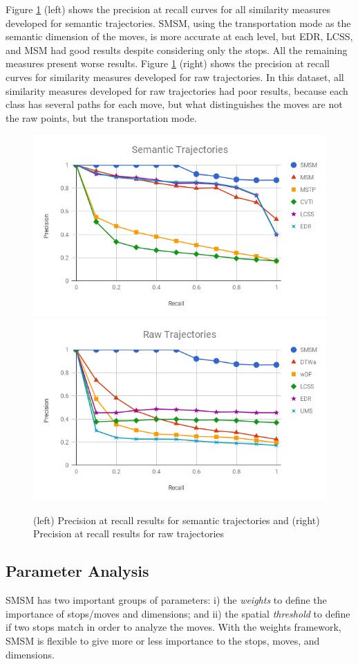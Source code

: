 {Figure {\ref{fig:hermoupolis_precision_recall}} (left) shows the precision at recall curves for all similarity measures developed for semantic trajectories. SMSM, using the transportation mode as the semantic dimension of the moves, is more accurate at each level, but EDR, LCSS, and MSM had   good results despite considering only the stops. All the remaining measures present worse results. Figure {\ref{fig:hermoupolis_precision_recall}} (right) shows the precision at recall curves for similarity measures developed for raw trajectories.  In this dataset, all similarity measures developed for raw trajectories had poor results, because each class has several paths for each move, but what distinguishes the moves are not the raw points, but the transportation mode.}

\begin{figure}[ht!]
\centerline{
\centering
\includegraphics[width=.45\textwidth]{Images/P_R-chart_Hermoupolis_semantic.png}
\includegraphics[width=.45\textwidth]{Images/P_R-chart_Hermoupolis_raw.png}
}
\caption{(left) Precision at recall results for semantic trajectories  and (right) Precision at recall results for raw  trajectories}
\label{fig:hermoupolis_precision_recall}
\end{figure}


\subsection{Parameter Analysis}\label{sec:sensitivity}

{SMSM has two important groups of parameters: i) the \emph{weights} to define the importance of stops/moves and dimensions; and ii) the spatial \emph{threshold} to define if two stops match in order to analyze the moves.
With the weights framework, SMSM is flexible to give more or less importance to the stops, moves, and dimensions. 
}

